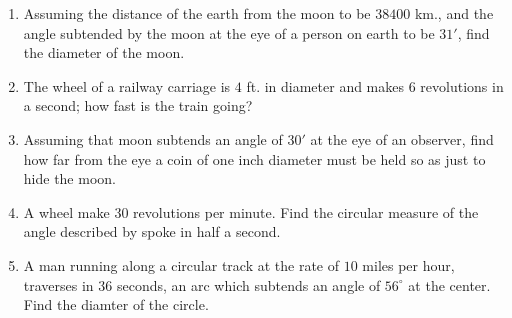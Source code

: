 \begin{enumerate}[resume]
\item Assuming the distance of the earth from the moon to be $38400$ km., and the angle subtended by the moon at the eye of a
    person on earth to be $31'$, find the diameter of the moon.
\item The wheel of a railway carriage is $4$ ft. in diameter and makes $6$ revolutions in a second; how fast is the train
    going?
\item Assuming that moon subtends an angle of $30'$ at the eye of an observer, find how far from the eye a coin of one inch
    diameter must be held so as just to hide the moon.
\item A wheel make $30$ revolutions per minute. Find the circular measure of the angle described by spoke in half a second.
\item A man running along a circular track at the rate of $10$ miles per hour, traverses in $36$ seconds, an arc which
    subtends an angle of $56^\circ$ at the center. Find the diamter of the circle.
\end{enumerate}
